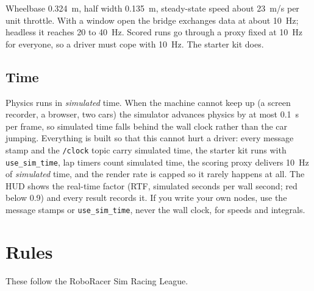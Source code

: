 \medskip
Wheelbase 0.324~m, half width 0.135~m, steady-state speed about 23~m/s per unit throttle.
With a window open the bridge exchanges data at about 10~Hz; headless it reaches 20 to
40~Hz. Scored runs go through a proxy fixed at 10~Hz for everyone, so a driver must cope
with 10~Hz. The starter kit does.

\subsection{Time}

Physics runs in \emph{simulated} time. When the machine cannot keep up (a screen recorder,
a browser, two cars) the simulator advances physics by at most 0.1~s per frame, so simulated
time falls behind the wall clock rather than the car jumping. Everything is built so that
this cannot hurt a driver: every message stamp and the \texttt{/clock} topic carry simulated
time, the starter kit runs with \texttt{use\_sim\_time}, lap timers count simulated time,
the scoring proxy delivers 10~Hz of \emph{simulated} time, and the render rate is capped so
it rarely happens at all. The HUD shows the real-time factor (RTF, simulated seconds per wall
second; red below 0.9) and every result records it. If you write your own nodes, use the
message stamps or \texttt{use\_sim\_time}, never the wall clock, for speeds and integrals.

\section{Rules}

These follow the RoboRacer Sim Racing League.

